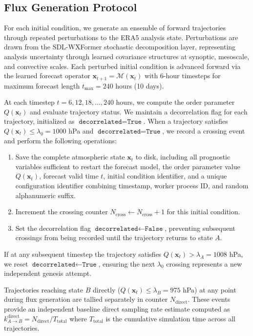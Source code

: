\documentclass[11pt]{article}
\begin{document}
\subsection{Flux Generation Protocol}

For each initial condition, we generate an ensemble of forward trajectories through repeated perturbations to the ERA5 analysis state. Perturbations are drawn from the SDL-WXFormer stochastic decomposition layer, representing analysis uncertainty through learned covariance structures at synoptic, mesoscale, and convective scales. Each perturbed initial condition is advanced forward via the learned forecast operator $\mathbf{x}_{t+1} = \mathcal{M}(\mathbf{x}_t)$ with 6-hour timesteps for maximum forecast length $t_{\text{max}} = 240$ hours (10 days).

At each timestep $t = 6, 12, 18, \ldots, 240$ hours, we compute the order parameter $Q(\mathbf{x}_t)$ and evaluate trajectory status. We maintain a decorrelation flag for each trajectory, initialized as $\texttt{decorrelated} = \texttt{True}$. When a trajectory satisfies $Q(\mathbf{x}_t) \leq \lambda_0 = 1000$ hPa and $\texttt{decorrelated} = \texttt{True}$, we record a crossing event and perform the following operations:

\begin{enumerate}
    \item Save the complete atmospheric state $\mathbf{x}_t$ to disk, including all prognostic variables sufficient to restart the forecast model, the order parameter value $Q(\mathbf{x}_t)$, forecast valid time $t$, initial condition identifier, and a unique configuration identifier combining timestamp, worker process ID, and random alphanumeric suffix.
    
    \item Increment the crossing counter $N_{\text{cross}} \gets N_{\text{cross}} + 1$ for this initial condition.
    
    \item Set the decorrelation flag $\texttt{decorrelated} \gets \texttt{False}$, preventing subsequent crossings from being recorded until the trajectory returns to state $A$.
\end{enumerate}

If at any subsequent timestep the trajectory satisfies $Q(\mathbf{x}_t) > \lambda_A = 1008$ hPa, we reset $\texttt{decorrelated} \gets \texttt{True}$, ensuring the next $\lambda_0$ crossing represents a new independent genesis attempt.

Trajectories reaching state $B$ directly ($Q(\mathbf{x}_t) \leq \lambda_B = 975$ hPa) at any point during flux generation are tallied separately in counter $N_{\text{direct}}$. These events provide an independent baseline direct sampling rate estimate computed as $k_{A \to B}^{\text{direct}} = N_{\text{direct}}/T_{\text{total}}$ where $T_{\text{total}}$ is the cumulative simulation time across all trajectories.
\end{document}
